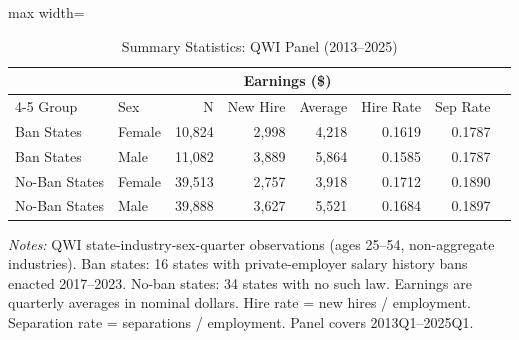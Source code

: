 \begin{table}[H]
\centering
\caption{Summary Statistics: QWI Panel (2013--2025)}
\label{tab:summary}
\begin{threeparttable}
\begin{adjustbox}{max width=\textwidth}
\begin{tabular}{llrrrrrr}
\toprule
 & & & \multicolumn{2}{c}{Earnings (\$)} & & \\
\cmidrule(lr){4-5}
Group & Sex & N & New Hire & Average & Hire Rate & Sep Rate \\
\midrule
Ban States & Female & 10,824 & 2,998 & 4,218 & 0.1619 & 0.1787 \\
Ban States & Male & 11,082 & 3,889 & 5,864 & 0.1585 & 0.1787 \\
No-Ban States & Female & 39,513 & 2,757 & 3,918 & 0.1712 & 0.1890 \\
No-Ban States & Male & 39,888 & 3,627 & 5,521 & 0.1684 & 0.1897 \\
\bottomrule
\end{tabular}
\end{adjustbox}
\begin{tablenotes}[flushleft]
\small
\item \emph{Notes:} QWI state-industry-sex-quarter observations (ages 25--54, non-aggregate industries). Ban states: 16 states with private-employer salary history bans enacted 2017--2023. No-ban states: 34 states with no such law. Earnings are quarterly averages in nominal dollars. Hire rate = new hires / employment. Separation rate = separations / employment. Panel covers 2013Q1--2025Q1.
\end{tablenotes}
\end{threeparttable}
\end{table}
